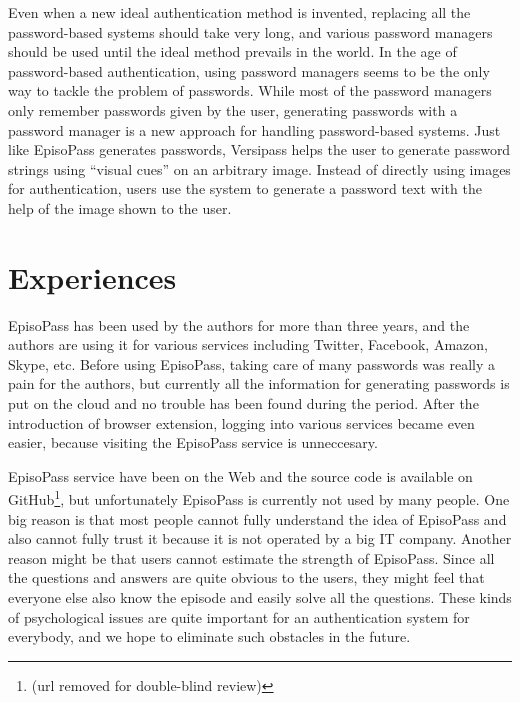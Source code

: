 \documentclass[runningheads,a4paper]{llncs}
\begin{document}
Even when a new ideal authentication method is invented,
replacing all the password-based systems should take very long, and
various password managers should be used until the ideal method
prevails in the world.
In the age of password-based authentication,
using password managers seems to be the only way to tackle
the problem of passwords.
%
While most of the password managers only remember passwords given by the user,
generating passwords with a password manager is a new approach for
handling password-based systems.
Just like EpisoPass generates passwords,
Versipass\cite{Stobert:2014:PMD:2683467.2683471} %
helps the user to generate password strings
using ``visual cues'' on an arbitrary image.
Instead of directly using images for authentication,
users use the system to generate a password text with the help of
the image shown to the user.

% 
% 
%

\section{Experiences}

EpisoPass has been used by the authors for more than three years, and
the authors are using it for various services including
Twitter, Facebook, Amazon, Skype, etc.
%
Before using EpisoPass, taking care of many passwords was really
a pain for the authors, but
currently all the information for generating passwords is put on the cloud
and no trouble has been found during the period.
%
After the introduction of browser extension,
logging into various services became even easier,
because visiting the EpisoPass service is unneccesary.

EpisoPass service have been on the Web and the source code is
available on GitHub\footnote{
  (url removed for double-blind review)
}, but
unfortunately EpisoPass is currently not used by many people.
One big reason is that most people cannot fully understand the
idea of EpisoPass and also cannot fully trust it
because it is not operated by a big IT company.
Another reason might be that users cannot estimate the strength
of EpisoPass.
Since all the questions and answers are
quite obvious to the users,
they might feel that everyone else also know the episode
and easily solve all the questions.
These kinds of psychological issues are quite important for
an authentication system for everybody,
and we hope to eliminate such obstacles in the future.
\end{document}
